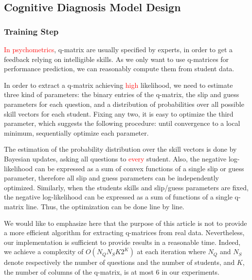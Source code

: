 \documentclass{sig-alternate}
\newcommand\alert[1]{\textcolor{red}{#1}}
\begin{document}
\subsection{Cognitive Diagnosis Model Design}

\subsubsection{Training Step}

\alert{In psychometrics}, q-matrix are usually specified by experts, in order to get a feedback relying on intelligible skills. As we only want to use q-matrices for performance prediction, we can reasonably compute them from student data.

In order to extract a q-matrix achieving \alert{high} likelihood, we need to estimate three kind of parameters: the binary entries of the q-matrix, the slip and guess parameters for each question, and a distribution of probabilities over all possible skill vectors for each student. Fixing any two, it is easy to optimize the third parameter, which suggests the following procedure: until convergence to a local minimum, sequentially optimize each parameter.

The estimation of the probability distribution over the skill vectors is done by Bayesian updates, asking all questions to \alert{every} student. Also, the negative log-likelihood can be expressed as a sum of convex functions of a single slip or guess parameter, therefore all slip and guess parameters can be independently optimized.  Similarly, when the students skills and slip/guess parameters are fixed, the negative log-likelihood can be expressed as a sum of functions of a single q-matrix line. Thus, the optimization can be done line by line. %


We would like to emphasize here that the purpose of this article is not to provide a more efficient algorithm for extracting q-matrices from real data. Nevertheless, our implementation is sufficient to provide results in a reasonable time. Indeed, we achieve a complexity of $O(N_Q N_S K 2^K)$ at each iteration where $N_Q$ and $N_S$ denote respectively the number of questions and the number of students, and $K$, the number of columns of the q-matrix, is at most 6 in our experiments.
\end{document}
